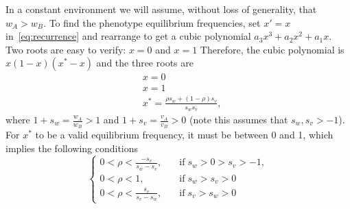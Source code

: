 \documentclass[14pt]{extarticle}
\begin{document}
In a constant environment we will assume, without loss of generality, that $w_A > w_B$.
To find the phenotype equilibrium frequencies,
set $x'=x$ in~\eqref{eq:recurrence} and rearrange to get a cubic polynomial $a_3x^3+a_2x^2+a_1x$.
Two roots are easy to verify: $x=0$ and $x=1$
Therefore, the cubic polynomial is $x (1-x) (x^*-x)$ and the three roots are
\begin{align} \label{eq:roots}
&x = 0 \\
&x = 1 \\
&x^* = 
\frac{\rho s_w + (1-\rho) s_v}{s_w s_v},
\end{align}
where $1+s_w=\frac{w_A}{w_B}>1$ and $1+s_v=\frac{v_A}{v_B}>0$ (note this assumes that $s_w, s_v > -1$).
For $x^*$ to be a valid equilibrium frequency, it must be between 0 and 1, which implies the following conditions
\begin{equation} \label{eq:xstar_conditions}
\begin{cases}
0 < \rho < \frac{-s_v}{s_w - s_v},& \quad \text{if}\; s_w > 0 > s_v > -1,\\
0 < \rho < 1,& \quad \text{if}\; s_w > s_v > 0 \\
0 < \rho < \frac{s_v}{s_v - s_w},& \quad \text{if}\; s_v > s_w > 0
\end{cases}
\end{equation}
\end{document}
